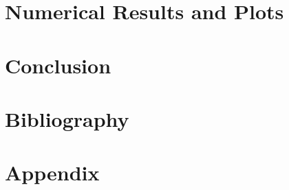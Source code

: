 \documentclass{article} %
\begin{document}
\vspace{-.2cm}
\section{Numerical Results and Plots}
\vspace{-.2cm}





\vspace{-.2cm}
\section{Conclusion}
\vspace{-.2cm}


\newpage
\section{Bibliography}

%



\newpage
\section{Appendix}
\end{document}
